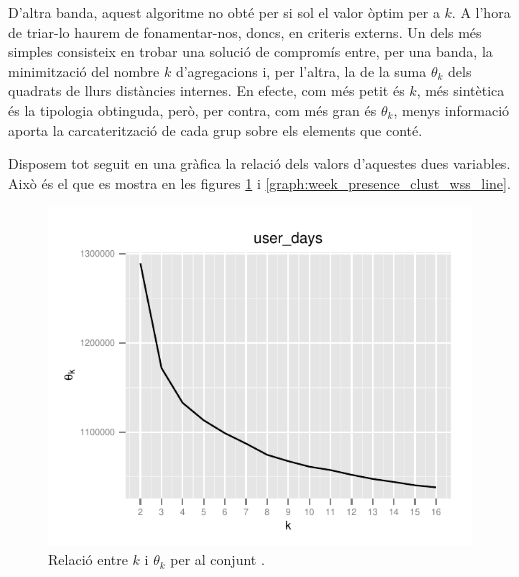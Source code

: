 \documentclass[
	a4paper,
	twoside,
	justified
]{tufte-book}
\begin{document}
D'altra banda, aquest algoritme no obté per si sol el valor òptim per a $k$. A l'hora de triar-lo haurem de fonamentar-nos, doncs, en criteris externs. Un dels més simples consisteix en trobar una solució de compromís entre, per una banda, la minimització del nombre $k$ d'agregacions i, per l'altra, la de la suma $\theta_k$ dels quadrats de llurs distàncies internes. En efecte, com més petit és $k$, més sintètica és la tipologia obtinguda, però, per contra, com més gran és $\theta_k$, menys informació aporta la carcaterització de cada grup sobre els elements que conté. 

Disposem tot seguit en una gràfica la relació dels valors d'aquestes dues variables. Això és el que es mostra en les figures \ref{graph:day_presence_clust_wss_line} i \ref{graph:week_presence_clust_wss_line}. 

\begin{figure}
\begin{center}
\includegraphics{day_presence_clust_wss_line}
\caption{
	\label{graph:day_presence_clust_wss_line}
	Relació entre $k$ i $\theta_k$ per al conjunt .
}
\end{center}
\end{figure}
\end{document}
